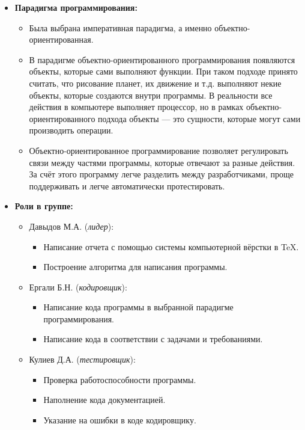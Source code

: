 \documentclass[14pt, oneside]{altsu-report}
\begin{document}
\begin{itemize}
    \item \textbf{Парадигма программирования:}
    \begin{itemize}
     \item Была выбрана императивная парадигма, а именно объектно-ориентированная.
     \item В парадигме объектно-ориентированного программирования появляются объекты, которые сами выполняют функции. При таком подходе принято считать, что рисование планет, их движение и т.д. выполняют некие объекты, которые создаются внутри программы. В реальности все действия в компьютере выполняет процессор, но в рамках объектно-ориентированного подхода объекты — это сущности, которые могут сами производить операции.
     \item Объектно-ориентированное программирование позволяет регулировать связи между частями программы, которые отвечают за разные действия. За счёт этого программу легче разделить между разработчиками, проще поддерживать и легче автоматически протестировать.
    \end{itemize}
    \item \textbf{Роли в группе:}
    \begin{itemize}
        \item Давыдов М.А. (\textit{лидер}):
            \begin{itemize}
                \item Написание отчета с помощью системы компьютерной вёрстки в \TeX.
                \item Построение алгоритма для написания программы.
            \end{itemize}
        \item Ергали Б.Н. (\textit{кодировщик}):
            \begin{itemize}
                \item Написание кода программы в выбранной парадигме программирования.
                \item Написание кода в соответствии с задачами и требованиями.
            \end{itemize}
        \item Кулиев Д.А. (\textit{тестировщик}):
            \begin{itemize}
                \item Проверка работоспособности программы.
                \item Наполнение кода документацией.
                \item Указание на ошибки в коде кодировщику.
            \end{itemize}
        \end{itemize}
\end{itemize}
\end{document}
